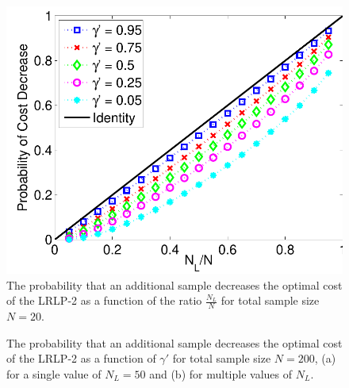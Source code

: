 \documentclass[11pt]{article}
\begin{document}
\begin{figure}
	\centering
	\includegraphics[width=.5\textwidth]{images/prob_dec_cost_v_nl_n_20}
	\caption{The probability that an additional sample decreases the optimal cost of the LRLP-2 as a function of the ratio $\frac{N_L}{N}$ for total sample size $N = 20$.}
	\label{fig:prob_cost_decrease_nd_n}
\end{figure}

\begin{figure}
	\centering
	\caption{The probability that an additional sample decreases the optimal cost of the LRLP-2 as a function of $\gamma'$ for total sample size $N = 200$, (a) for a single value of $N_L = 50$ and (b) for multiple values of $N_L$.}
\end{figure}
\end{document}
